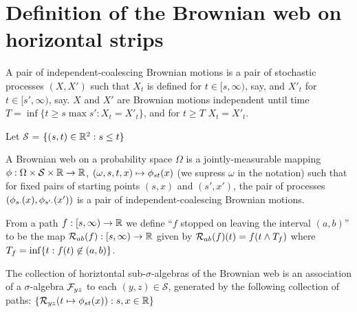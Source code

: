 {
\newcommand{\simplex}{\mathcal{S}}

\section{Definition of the Brownian web on horizontal strips}

\begin{definition}
  A pair of independent-coalescing Brownian motions is a pair of
  stochastic processes $(X, X')$ such that $X_t$ is defined for $t \in
  [s, \infty)$, say, and $X'_t$ for $t \in [s', \infty)$, say.  $X$
      and $X'$ are Brownian motions independent until time $T = \inf
      \{ t \ge s \max s' : X_t = X'_t\}$, and for $t \ge T$ $X_t =
      X'_t$.
\end{definition}

\begin{definition}
  Let $\simplex$ = $\{(s, t) \in \mathbb{R}^2 : s \le t\}$
\end{definition}

\begin{definition}
  A Brownian web on a probability space $\Omega$ is a
  jointly-measurable mapping $\webnoargs : \Omega \cross \simplex \cross
  \R \to \R$, $(\omega, s, t, x) \mapsto \phi_{{s}{t}}(x)$ (we supress
  $\omega$ in the notation) such that for fixed pairs of starting
  points $(s, x)$ and $(s', x')$, the pair of processes $(\phi_{{s}{\cdot}}(x), \phi_{{s'}{\cdot}}(x'))$ is a pair of independent-coalescing
  Brownian motions.
\end{definition}

\begin{definition}
  \newcommand{\T}{\stripleavetime{f}}
  \label{def:restrict}
  From a path $f : [s, \infty) \to \mathbb{R}$ we define ``$f$ stopped on
    leaving the interval $(a,b)$'' to be the map $\mathcal{R}_{{a}{b}}(f) : [s,
      \infty) \to \mathbb{R}$ given by $\restrict{a}{b}{f}(t) = f(t \minsym \T)$
      where $\T = \inf\{ t : f(t) \not\in (a,b) \}$.
\end{definition}

\newcommand{\brownianwebnoise}{collection of horiztontal
  sub-$\sigma$-algebras of the Brownian web}

\begin{definition}
  The \brownianwebnoise{} is an
  association of a $\sigma$-algebra $\mathcal{F}_{y z}$ to each $(y, z)
  \in \simplex$, generated by the following collection of paths:
  $\{ \mathcal{R}_{{y}{z}}(t \mapsto \phi_{{s}{t}}(x)) : s, x \in \mathbb{R} \}$
\end{definition}

}

